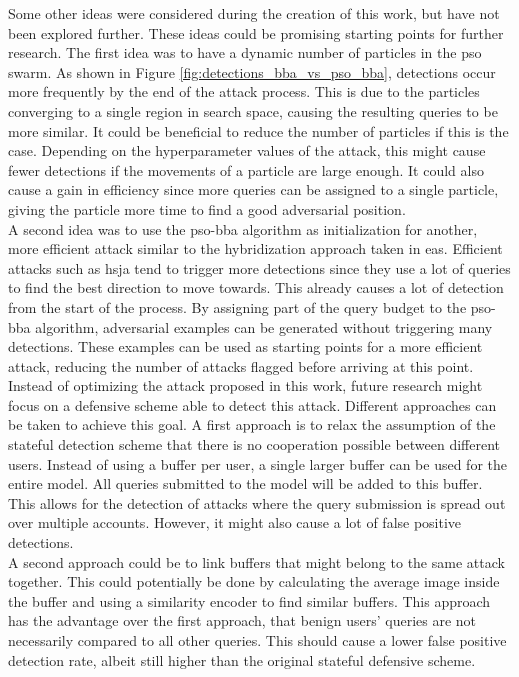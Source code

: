 Some other ideas were considered during the creation of this work, but have not been explored further. These ideas could be promising starting points for further research. The first idea was to have a dynamic number of particles in the \gls{pso} swarm. As shown in Figure \ref{fig:detections_bba_vs_pso_bba}, detections occur more frequently by the end of the attack process. This is due to the particles converging to a single region in search space, causing the resulting queries to be more similar. It could be beneficial to reduce the number of particles if this is the case. Depending on the hyperparameter values of the attack, this might cause fewer detections if the movements of a particle are large enough. It could also cause a gain in efficiency since more queries can be assigned to a single particle, giving the particle more time to find a good adversarial position.\\

A second idea was to use the \gls{pso}-\gls{bba} algorithm as initialization for another, more efficient attack similar to the hybridization approach taken in \glspl{ea}. Efficient attacks such as \gls{hsja} tend to trigger more detections since they use a lot of queries to find the best direction to move towards. This already causes a lot of detection from the start of the process. By assigning part of the query budget to the \gls{pso}-\gls{bba} algorithm, adversarial examples can be generated without triggering many detections. These examples can be used as starting points for a more efficient attack, reducing the number of attacks flagged before arriving at this point.\\

Instead of optimizing the attack proposed in this work, future research might focus on a defensive scheme able to detect this attack. Different approaches can be taken to achieve this goal. A first approach is to relax the assumption of the stateful detection scheme that there is no cooperation possible between different users. Instead of using a buffer per user, a single larger buffer can be used for the entire model. All queries submitted to the model will be added to this buffer. This allows for the detection of attacks where the query submission is spread out over multiple accounts. However, it might also cause a lot of false positive detections.\\ 

A second approach could be to link buffers that might belong to the same attack together. This could potentially be done by calculating the average image inside the buffer and using a similarity encoder to find similar buffers. This approach has the advantage over the first approach, that benign users' queries are not necessarily compared to all other queries. This should cause a lower false positive detection rate, albeit still higher than the original stateful defensive scheme.\\

